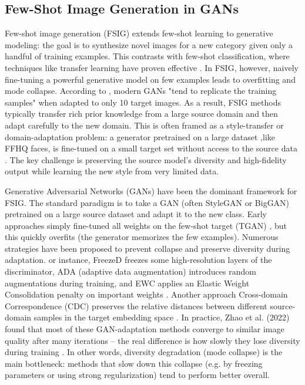 \subsection{Few-Shot Image Generation in GANs}

Few-shot image generation (FSIG) extends few-shot learning to generative modeling: 
the goal is to synthesize novel images for a new category given only a handful of training examples. 
This contrasts with few-shot classification, where techniques like transfer learning have proven effective \cite{chowdhury2021fewshotimageclassificationjust}.
In FSIG, however, naively fine-tuning a powerful generative model on few examples leads to overfitting and mode collapse.
According to \cite{zhao2023closerlookfewshotimage}, modern GANs "tend to replicate the training samples" when adapted to only 10 target images.
As a result, FSIG methods typically transfer rich prior knowledge from a large source domain and then adapt carefully to the new domain. 
This is often framed as a style-transfer or domain-adaptation problem: 
a generator pretrained on a large dataset ,like FFHQ faces, is fine-tuned on a small target set without access to the source data \cite{cao2024fewshotimagegenerationconditional,zhao2023closerlookfewshotimage}.
The key challenge is preserving the source model's diversity and high-fidelity output while learning the new style from very limited data.

Generative Adversarial Networks (GANs) have been the dominant framework for FSIG. 
The standard paradigm is to take a GAN (often StyleGAN or BigGAN) pretrained on a 
large source dataset and adapt it to the new class. Early approaches simply fine-tuned all weights on the few-shot 
target (TGAN) \cite{zhao2023closerlookfewshotimage}, but this quickly overfits (the generator memorizes the few examples). Numerous strategies have been proposed to prevent collapse and preserve diversity during adaptation.
or instance, FreezeD freezes some high-resolution layers of the discriminator, ADA (adaptive data augmentation) introduces random augmentations during training, and EWC applies an Elastic Weight Consolidation penalty on important weights \cite{mo2020freezediscriminatorsimplebaseline}.
Another approach Cross-domain Correspondence (CDC) preserves the relative distances between different source-domain samples in the target embedding space \cite{ojha2021fewshotimagegenerationcrossdomain}.
In practice, Zhao et al. (2022) found that most of these GAN-adaptation methods converge to similar image quality after many iterations -- the real difference is how slowly they lose diversity during training \cite{zhao2023closerlookfewshotimage}.
In other words, diversity degradation (mode collapse) is the main bottleneck: methods that slow down this collapse (e.g. by freezing parameters or using strong regularization) tend to perform better overall.


